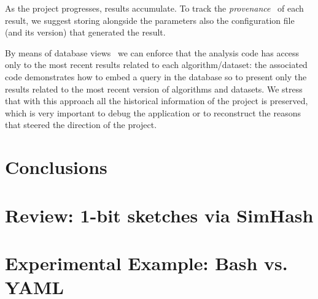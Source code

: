 \documentclass{llncs}
\begin{document}
As the project progresses, results accumulate. To track the
\emph{provenance}~\cite{BunemanKW01} of each result, we suggest storing alongside
the parameters also the configuration file (and its version) that generated the result.

By means of database views~\cite{citation-needed} we can enforce that the analysis code
has access only to the most recent results related to each algorithm/dataset: the associated code
demonstrates how to embed a query in the database so to present only the results related to 
the most recent version of algorithms and datasets.
We stress that with this approach all the historical information of the project is preserved,
which is very important to debug the application or to reconstruct the reasons that
steered the direction of the project.

\section{Conclusions}




\appendix

\section{Review: 1-bit sketches via SimHash}
\label{app:sketches}

\section{Experimental Example: Bash vs. YAML}
\label{app:experiment-file}
\end{document}
